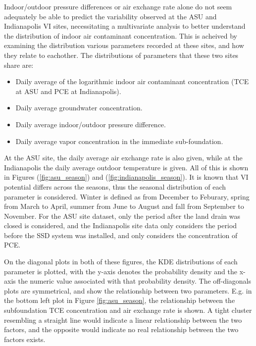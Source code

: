 \documentclass[journal=esthag,manuscript=article]{achemso}
\begin{document}
Indoor/outdoor pressure differences or air exchange rate alone do not seem adequately be able to predict the variability observed at the ASU and Indianapolis VI sites, necessitating a multivariate analysis to better understand the distribution of indoor air contaminant concentration.
This is acheived by examining the distribution various parameters recorded at these sites, and how they relate to eachother.
The distributions of parameters that these two sites share are:
\begin{itemize}
  \item Daily average of the logarithmic indoor air contaminant concentration (TCE at ASU and PCE at Indianapolis).
  \item Daily average groundwater concentration.
  \item Daily average indoor/outdoor pressure difference.
  \item Daily average vapor concentration in the immediate sub-foundation.
\end{itemize}
At the ASU site, the daily average air exchange rate is also given, while at the Indianapolis the daily average outdoor temperature is given.
All of this is shown in Figures (\ref{fig:asu_season}) and (\ref{fig:indianapolis_season}).
It is known that VI potential differs across the seasons, thus the seasonal distribution of each parameter is considered.
Winter is defined as from December to Feburary, spring from March to April, summer from June to August and fall from September to November.
For the ASU site dataset, only the period after the land drain was closed is considered, and the Indianapolis site data only considers the period before the SSD system was installed, and only considers the concentration of PCE.\par

On the diagonal plots in both of these figures, the KDE distributions of each parameter is plotted, with the y-axis denotes the probability density and the x-axis the numeric value associated with that probability density.
The off-diagonals plots are symmetrical, and show the relationship between two parameters.
E.g. in the bottom left plot in Figure \ref{fig:asu_season}, the relationship between the subfoundation TCE concentration and air exchange rate is shown.
A tight cluster resembling a straight line would indicate a linear relationship between the two factors, and the opposite would indicate no real relationship between the two factors exists. \par
\end{document}

